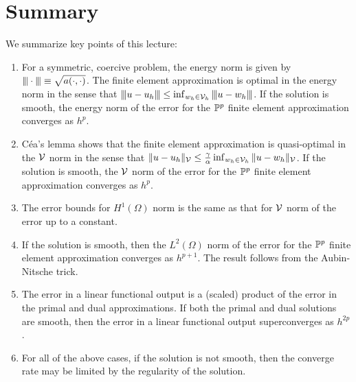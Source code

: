 \section{Summary}
We summarize key points of this lecture:
\begin{enumerate}
\item For a symmetric, coercive problem, the energy norm is given by $|\kern-1pt|\kern-1pt| \cdot |\kern-1pt|\kern-1pt| \equiv \sqrt{a(\cdot,\cdot)}$.  The finite element approximation is optimal in the energy norm in the sense that $|\kern-1pt|\kern-1pt| u - u_h |\kern-1pt|\kern-1pt| \leq \inf_{w_h \in \mathcal{V}_h} |\kern-1pt|\kern-1pt| u - w_h |\kern-1pt|\kern-1pt|$.  If the solution is smooth, the energy norm of the error for the $\mathbb{P}^p$ finite element approximation converges as $h^p$.
\item C\'ea's lemma shows that the finite element approximation is quasi-optimal in the $\mathcal{V}$ norm in the sense that $\| u - u_h \|_{\mathcal{V}} \leq \frac{\gamma}{\alpha} \inf_{w_h \in \mathcal{V}_h} \| u - w_h \|_{\mathcal{V}}$.  If the solution is smooth, the $\mathcal{V}$  norm of the error for the $\mathbb{P}^p$ finite element approximation converges as $h^p$.
\item The error bounds for $H^1(\Omega)$ norm is the same as that for $\mathcal{V}$ norm of the error up to a constant.
\item If the solution is smooth, then the $L^2(\Omega)$ norm of the error for the $\mathbb{P}^p$ finite element approximation converges as $h^{p+1}$.  The result follows from the Aubin-Nitsche trick.
\item The error in a linear functional output is a (scaled) product of the error in the primal and dual approximations. If both the primal and dual solutions are smooth, then the error in a linear functional output superconverges as $h^{2p}$.
\item For all of the above cases, if the solution is not smooth, then the converge rate may be limited by the regularity of the solution.
\end{enumerate}
